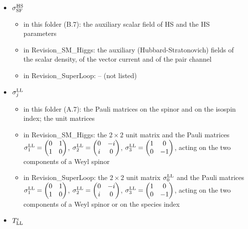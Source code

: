 \documentclass[
  10pt,
]{article}
\providecommand{\tightlist}{%
  \setlength{\itemsep}{0pt}\setlength{\parskip}{0pt}}
\begin{document}
\begin{itemize}
  \begin{itemize}
  \tightlist
  \item
    in this folder (B.7): the auxiliary scalar field of HS and the HS
    parameters
  \item
    in Revision\_SM\_Higgs: the HS parameters: the shares (between 0 and
    1) of the scalar and of the vector contact term that are decoupled
    in the density channels (their direct contraction); the rest of each
    term is decoupled in the pair channels (its pair contraction)
  \item
    in Revision\_SuperLoop: -- (not listed)
  \end{itemize}
\item
  \(\sigma^{\rm HS}_{\rm SF}\)

  \begin{itemize}
  \tightlist
  \item
    in this folder (B.7): the auxiliary scalar field of HS and the HS
    parameters
  \item
    in Revision\_SM\_Higgs: the auxiliary (Hubbard-Stratonovich) fields
    of the scalar density, of the vector current and of the pair channel
  \item
    in Revision\_SuperLoop: -- (not listed)
  \end{itemize}
\item
  \(\sigma^{\rm LL}_j\)

  \begin{itemize}
  \tightlist
  \item
    in this folder (A.7): the Pauli matrices on the spinor and on the
    isospin index; the unit matrices
  \item
    in Revision\_SM\_Higgs: the \(2\times2\) unit matrix and the Pauli
    matrices \(\sigma^{\rm LL}_1=\begin{pmatrix}0&1\\1&0\end{pmatrix}\),
    \(\sigma^{\rm LL}_2=\begin{pmatrix}0&-i\\i&0\end{pmatrix}\),
    \(\sigma^{\rm LL}_3=\begin{pmatrix}1&0\\0&-1\end{pmatrix}\), acting
    on the two components of a Weyl spinor
  \item
    in Revision\_SuperLoop: the \(2\times2\) unit matrix
    \(\sigma^{\rm LL}_0\) and the Pauli matrices
    \(\sigma^{\rm LL}_1=\begin{pmatrix}0&1\\1&0\end{pmatrix}\),
    \(\sigma^{\rm LL}_2=\begin{pmatrix}0&-i\\i&0\end{pmatrix}\),
    \(\sigma^{\rm LL}_3=\begin{pmatrix}1&0\\0&-1\end{pmatrix}\), acting
    on the two components of a Weyl spinor or on the species index
  \end{itemize}
\item
  \(T^\iota_{\rm LL}\)


\end{itemize}
\end{document}
